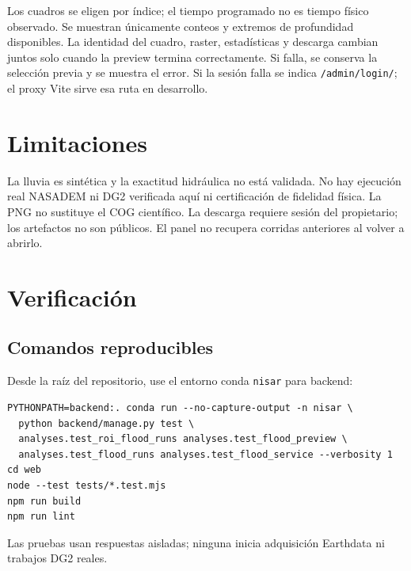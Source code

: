 \documentclass{article}
\begin{document}
Los cuadros se eligen por índice; el tiempo programado no es tiempo físico observado. Se muestran únicamente conteos y extremos de profundidad disponibles. La identidad del cuadro, raster, estadísticas y descarga cambian juntos solo cuando la preview termina correctamente. Si falla, se conserva la selección previa y se muestra el error. Si la sesión falla se indica \texttt{/admin/login/}; el proxy Vite sirve esa ruta en desarrollo.

\section{Limitaciones}
La lluvia es sintética y la exactitud hidráulica no está validada. No hay ejecución real NASADEM ni DG2 verificada aquí ni certificación de fidelidad física. La PNG no sustituye el COG científico. La descarga requiere sesión del propietario; los artefactos no son públicos. El panel no recupera corridas anteriores al volver a abrirlo.

\section{Verificación}
\subsection{Comandos reproducibles}
Desde la raíz del repositorio, use el entorno conda \texttt{nisar} para backend:
\begin{verbatim}
PYTHONPATH=backend:. conda run --no-capture-output -n nisar \
  python backend/manage.py test \
  analyses.test_roi_flood_runs analyses.test_flood_preview \
  analyses.test_flood_runs analyses.test_flood_service --verbosity 1
cd web
node --test tests/*.test.mjs
npm run build
npm run lint
\end{verbatim}
Las pruebas usan respuestas aisladas; ninguna inicia adquisición Earthdata ni trabajos DG2 reales.
\end{document}
